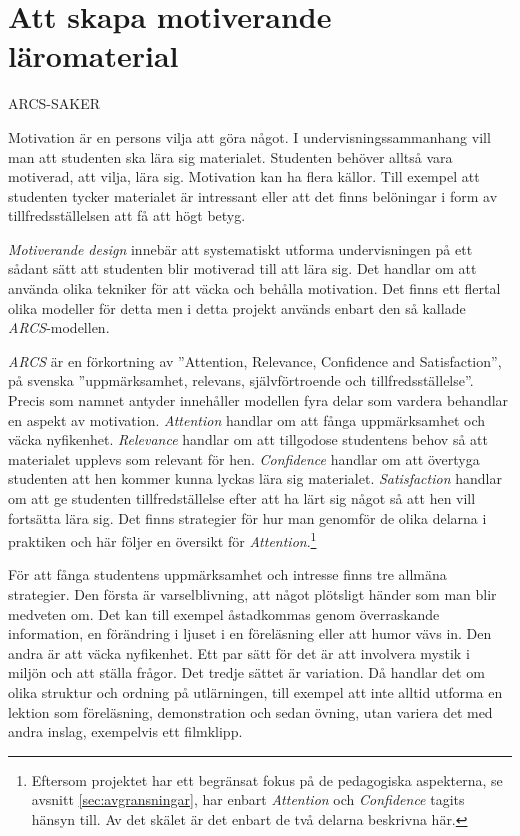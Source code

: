 \section{Att skapa motiverande läromaterial}
\label{sec:arcs}
\begin{binge}
ARCS-SAKER

Motivation är en persons vilja att göra något. I undervisningssammanhang vill man att studenten ska lära sig materialet. Studenten behöver alltså vara motiverad, att vilja, lära sig. Motivation kan ha flera källor. Till exempel att studenten tycker materialet är intressant eller att det finns belöningar i form av tillfredsställelsen att få att högt betyg. 

\textit{Motiverande design} innebär att systematiskt utforma undervisningen på ett sådant sätt att studenten blir motiverad till att lära sig. Det handlar om att använda olika tekniker för att väcka och behålla motivation. Det finns ett flertal olika modeller för detta men i detta projekt används enbart den så kallade \textit{ARCS}-modellen.\cite{arcs_book}

\textit{ARCS} är en förkortning av ''Attention, Relevance, Confidence and Satisfaction'', på svenska ''uppmärksamhet, relevans, självförtroende och tillfredsställelse''. Precis som namnet antyder innehåller modellen fyra delar som vardera behandlar en aspekt av motivation. \textit{Attention} handlar om att fånga uppmärksamhet och väcka nyfikenhet. \textit{Relevance} handlar om att tillgodose studentens behov så att materialet upplevs som relevant för hen. \textit{Confidence} handlar om att övertyga studenten att hen kommer kunna lyckas lära sig materialet. \textit{Satisfaction} handlar om att ge studenten tillfredställelse efter att ha lärt sig något så att hen vill fortsätta lära sig. Det finns strategier för hur man genomför de olika delarna i praktiken och här följer en översikt för \textit{Attention}.\footnote{Eftersom projektet har ett begränsat fokus på de pedagogiska aspekterna, se avsnitt \ref{sec:avgransningar}, har enbart \textit{Attention} och \textit{Confidence} tagits hänsyn till. Av det skälet är det enbart de två delarna beskrivna här.}

För att fånga studentens uppmärksamhet och intresse finns tre allmäna strategier. Den första är varselblivning, att något plötsligt händer som man blir medveten om. Det kan till exempel åstadkommas genom överraskande information, en förändring i ljuset i en föreläsning eller att humor vävs in. Den andra är att väcka nyfikenhet. Ett par sätt för det är att involvera mystik i miljön och att ställa frågor. Det tredje sättet är variation. Då handlar det om olika struktur och ordning på utlärningen, till exempel att inte alltid utforma en lektion som föreläsning, demonstration och sedan övning, utan variera det med andra inslag, exempelvis ett filmklipp.



\end{binge}
